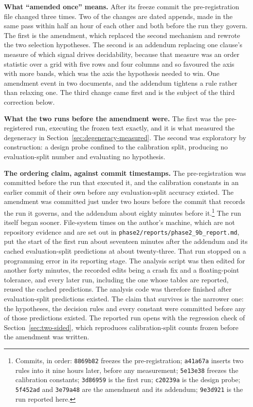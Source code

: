 \documentclass[11pt]{article}
\begin{document}
\textbf{What ``amended once'' means.} After its freeze commit the
pre-registration file changed three times. Two of the changes are dated
appends, made in the same pass within half an hour of each other and both before the
run they govern. The first is the amendment, which replaced the second
mechanism and rewrote the two selection hypotheses. The second is an addendum
replacing one clause's measure of which signal drives decidability, because
that measure was an order statistic over a grid with five rows and four
columns and so favoured the axis with more bands, which was the axis the
hypothesis needed to win. One amendment event in two documents, and the
addendum tightens a rule rather than relaxing one. The third change came
first and is the subject of the third correction below.

\textbf{What the two runs before the amendment were.} The first was the
pre-registered run, executing the frozen text exactly, and it is what measured
the degeneracy in Section~\ref{sec:degeneracy-measured}. The second was
exploratory by construction: a design probe confined to the calibration split,
producing no evaluation-split number and evaluating no hypothesis.

\textbf{The ordering claim, against commit timestamps.} The pre-registration
was committed before the run that executed it, and the calibration constants
in an earlier commit of their own before any evaluation-split accuracy
existed. The amendment was committed just under two hours before the commit
that records the run it governs, and the addendum about eighty minutes before
it.\footnote{Commits, in order: \texttt{8869b82} freezes the
pre-registration; \texttt{a41a67a} inserts two rules into it nine hours later,
before any measurement; \texttt{5e13e38} freezes the calibration constants;
\texttt{3d86959} is the first run; \texttt{c20239a} is the design probe;
\texttt{5f452ad} and \texttt{3e79a48} are the amendment and its addendum;
\texttt{9e3d921} is the run reported here.} The run itself began sooner.
File-system times on the author's machine, which are not repository evidence
and are set out in \texttt{phase2/reports/phase2\_9b\_report.md}, put the
start of the first run about seventeen minutes after the addendum and its
cached evaluation-split predictions at about twenty-three. That run stopped on
a programming error in its reporting stage. The analysis script was then
edited for another forty minutes, the recorded edits being a crash fix and a
floating-point tolerance, and every later run, including the one whose tables
are reported, reused the cached predictions. The analysis code was therefore
finished after evaluation-split predictions existed. The claim that survives
is the narrower one: the hypotheses, the decision rules and every constant
were committed before any of those predictions existed. The reported run opens with the regression check of Section~\ref{sec:two-sided}, which reproduces
calibration-split counts frozen before the amendment was written.
\end{document}
